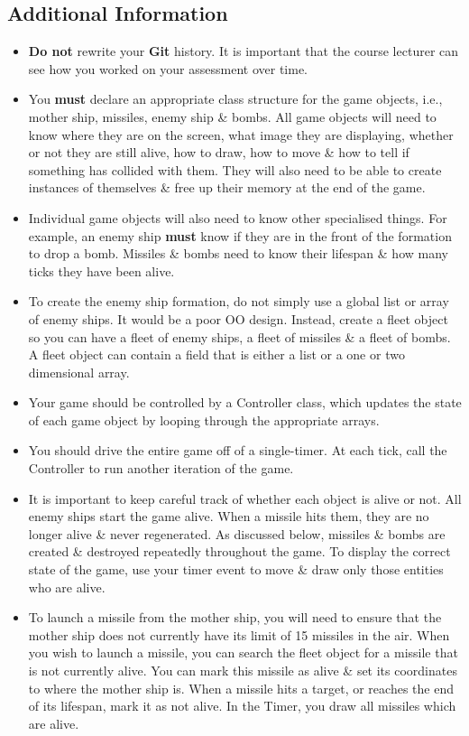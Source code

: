 \documentclass{article}
\begin{document}
\subsection*{Additional Information}
\begin{itemize}
    \item \textbf{Do not} rewrite your \textbf{Git} history. It is important that the course lecturer can see how you worked on your assessment over time.
    \item You \textbf{must} declare an appropriate class structure for the game objects, i.e., mother ship, missiles, enemy ship \& bombs. All game objects will need to know where they are on the screen, what image they are displaying, whether or not they are still alive, how to draw, how to move \& how to tell if something has collided with them. They will also need to be able to create instances of themselves \& free up their memory at the end of the game.
    \item Individual game objects will also need to know other specialised things. For example, an enemy ship \textbf{must} know if they are in the front of the formation to drop a bomb. Missiles \& bombs need to know their lifespan \& how many ticks they have been alive.
    \item To create the enemy ship formation, do not simply use a global list or array of enemy ships. It would be a poor OO design. Instead, create a fleet object so you can have a fleet of enemy ships, a fleet of missiles \& a fleet of bombs. A fleet object can contain a field that is either a list or a one or two dimensional array.
    \item Your game should be controlled by a Controller class, which updates the state of each game object by looping through the appropriate arrays.
    \item You should drive the entire game off of a single-timer. At each tick, call the Controller to run another iteration of the game.
    \item It is important to keep careful track of whether each object is alive or not. All enemy ships start the game alive. When a missile hits them, they are no longer alive \& never regenerated. As discussed below, missiles \& bombs are created \& destroyed repeatedly throughout the game. To display the correct state of the game, use your timer event to move \& draw only those entities who are alive.
    \item To launch a missile from the mother ship, you will need to ensure that the mother ship does not currently have its limit of 15 missiles in the air. When you wish to launch a missile, you can search the fleet object for a missile that is not currently alive. You can mark this missile as alive \& set its coordinates to where the mother ship is. When a missile hits a target, or reaches the end of its lifespan, mark it as not alive. In the Timer, you draw all missiles which are alive. 

\end{itemize}
\end{document}
